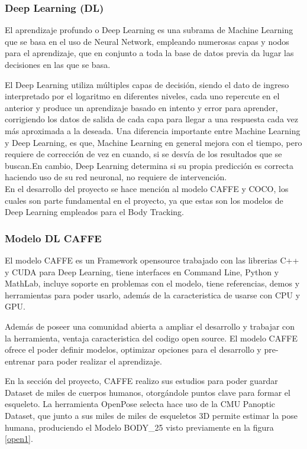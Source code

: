 \subsubsection{Deep Learning (DL)}

El aprendizaje profundo o Deep Learning es una subrama de Machine Learning que se basa en el uso de Neural Network, empleando numerosas capas y nodos para el aprendizaje, que en conjunto a toda la base de datos previa da lugar las decisiones en las que se basa.

El Deep Learning utiliza múltiples capas de decisión, siendo el dato de ingreso interpretado por el logaritmo en diferentes niveles, cada uno repercute en el anterior y produce un aprendizaje basado en intento y error para aprender, corrigiendo los datos de salida de cada capa para llegar a una respuesta cada vez más aproximada a la deseada.
Una diferencia importante entre Machine Learning y Deep Learning, es que, Machine Learning en general mejora con el tiempo, pero requiere de corrección de vez en cuando, si se desvía de los resultados que se buscan.En cambio, Deep Learning determina si su propia predicción es correcta haciendo uso de su red neuronal, no requiere de intervención.
\\
En el desarrollo del proyecto se hace mención al modelo CAFFE y COCO, los cuales son parte fundamental en el proyecto, ya que estas son los modelos de Deep Learning empleados para el Body Tracking.

\subsubsection{Modelo DL CAFFE}

El modelo CAFFE es un Framework opensource trabajado con las librerias C++ y CUDA para Deep Learning, tiene interfaces en Command Line, Python y MathLab, incluye soporte en problemas con el modelo, tiene referencias, demos y herramientas para poder usarlo, además de la caracteristica de usarse con CPU y GPU\cite{jia2014caffe}.

Además de poseer una comunidad abierta a ampliar el desarrollo y trabajar con la herramienta, ventaja caracteristica del codigo open source. 
El modelo CAFFE ofrece el poder definir modelos, optimizar opciones para el desarrollo y pre-entrenar para poder realizar el aprendizaje.

En la sección del proyecto, CAFFE realizo sus estudios para poder guardar Dataset de miles de cuerpos humanos, otorgándole puntos clave para formar el esqueleto. 
La herramienta OpenPose selecta hace uso de la CMU Panoptic Dataset, que junto a  sus miles de miles de esqueletos 3D permite estimar la pose humana, produciendo el Modelo BODY\_25 visto previamente en la figura \ref{open1}.

